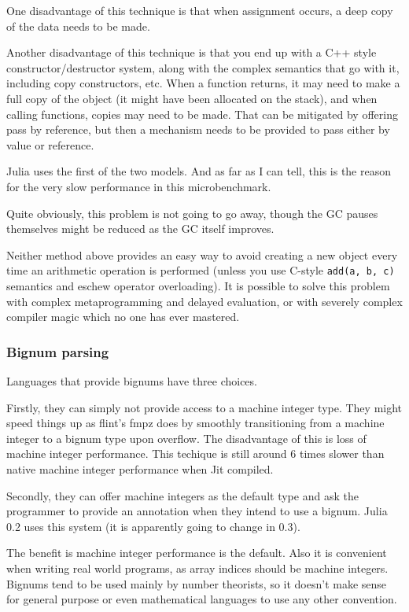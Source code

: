 \documentclass[a4paper,10pt]{article}
\newcommand{\code}{\lstinline}
\begin{document}
One disadvantage of this technique is that when assignment occurs, a deep copy of the data needs to
be made.

Another disadvantage of this technique is that you end up with a C++ style constructor/destructor
system, along with the complex semantics that go with it, including copy constructors, etc. When
a function returns, it may need to make a full copy of the object (it might have been allocated
on the stack), and when calling functions, copies may need to be made. That can be mitigated by
offering pass by reference, but then a mechanism needs to be provided to pass either by value or
reference.

Julia uses the first of the two models. And as far as I can tell, this is the reason for the very
slow performance in this microbenchmark.

Quite obviously, this problem is not going to go away, though the GC pauses themselves might be
reduced as the GC itself improves.

Neither method above provides an easy way to avoid creating a new object every time an arithmetic 
operation is performed (unless you use C-style \code{add(a, b, c)} semantics and eschew operator
overloading). It is possible to solve this problem with complex metaprogramming and delayed
evaluation, or with severely complex compiler magic which no one has ever mastered.

\subsubsection{Bignum parsing}

Languages that provide bignums have three choices.

Firstly, they can simply not provide access to a machine integer type. They might speed things up
as flint's fmpz does by smoothly transitioning from a machine integer to a bignum type upon
overflow. The disadvantage of this is loss of machine integer performance. This techique is still
around 6 times slower than native machine integer performance when Jit compiled.

Secondly, they can offer machine integers as the default type and ask the programmer to provide an
annotation when they intend to use a bignum. Julia 0.2 uses this system (it is apparently going to
change in 0.3).

The benefit is machine integer performance is the default. Also it is convenient when writing real
world programs, as array indices should be machine integers. Bignums tend to be used mainly by
number theorists, so it doesn't make sense for general purpose or even mathematical languages to
use any other convention.
\end{document}
